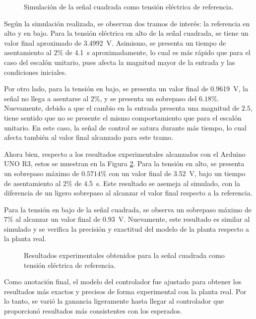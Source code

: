 \begin{figure}[htbp]
    \centering
    \caption{Simulación de la señal cuadrada como tensión eléctrica de referencia.}
    \label{fig:respuesta-sim-senal-cuadrada}
\end{figure}

Según la simulación realizada, se observan dos tramos de interés: la referencia en alto y en bajo.
Para la tensión eléctrica en alto de la señal cuadrada, se tiene un valor final aproximado de \SI{3.4992}{\volt}.
Asimismo, se presenta un tiempo de asentamiento al $2\%$ de \SI{4.1}{\second} aproximadamente, lo cual es más rápido que para el caso del escalón unitario, pues afecta la magnitud mayor de la entrada y las condiciones iniciales.

Por otro lado, para la tensión en bajo, se presenta un valor final de \SI{0.9619}{\volt}, la señal no llega a asentarse al $2\%$, y se presenta un sobrepaso del $6.18\%$.
Nuevamente, debido a que el cambio en la entrada presenta una magnitud de $2.5$, tiene sentido que no se presente el mismo comportamiento que para el escalón unitario.
En este caso, la señal de control se satura durante más tiempo, lo cual afecta también al valor final alcanzado para este tramo.

Ahora bien, respecto a los resultados experimentales alcanzados con el Arduino UNO R3, estos se muestran en la Figura \ref{fig:respuesta-exp-senal-cuadrada}.
Para la tensión en alto, se presenta un sobrepaso máximo de $0.5714\%$ con un valor final de \SI{3.52}{\volt}, bajo un tiempo de asentamiento al $2\%$ de \SI{4.5}{\second}.
Este resultado se asemeja al simulado, con la diferencia de un ligero sobrepaso al alcanzar el valor final respecto a la referencia.

Para la tensión en bajo de la señal cuadrada, se observa un sobrepaso máximo de $7\%$ al alcanzar un valor final de \SI{0.93}{\volt}.
Nuevamente, este resultado es similar al simulado y se verifica la precisión y exactitud del modelo de la planta respecto a la planta real.

\begin{figure}[htbp]
    \centering
    \caption{Resultados experimentales obtenidos para la señal cuadrada como tensión eléctrica de referencia.}
    \label{fig:respuesta-exp-senal-cuadrada}
\end{figure}

Como anotación final, el modelo del controlador fue ajustado para obtener los resultados más exactos y precisos de forma experimental con la planta real.
Por lo tanto, se varió la ganancia ligeramente hasta llegar al controlador que proporcionó resultados más consistentes con los esperados.
